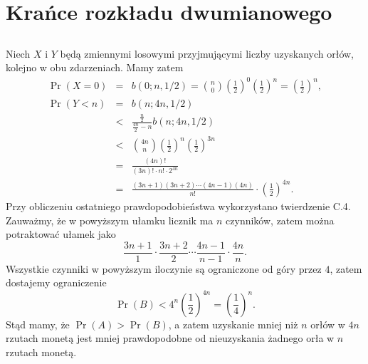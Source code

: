 \subsection{} %

\subsection{} %

\section{Krańce rozkładu dwumianowego}

\subsection{} %
Niech $X$ i $Y$ będą zmiennymi losowymi przyjmującymi liczby uzyskanych orłów, kolejno w obu zdarzeniach. Mamy zatem
\begin{eqnarray*}
	\Pr(X=0) &=& b(0;n,1/2) = \binom{n}{0}\left(\frac{1}{2}\right)^0\left(\frac{1}{2}\right)^n = \left(\frac{1}{2}\right)^n, \\
	\Pr(Y<n) &=& b(n;4n,1/2) \\
	&<& \frac{\frac{n}{2}}{\frac{4n}{2}-n}b(n;4n,1/2) \\
	&<& \binom{4n}{n}\left(\frac{1}{2}\right)^n\left(\frac{1}{2}\right)^{3n} \\
	&=& \frac{(4n)!}{(3n)!\cdot n!\cdot 2^{4n}} \\
	&=& \frac{(3n+1)(3n+2)\cdots(4n-1)(4n)}{n!}\cdot\left(\frac{1}{2}\right)^{4n}.
\end{eqnarray*}
Przy obliczeniu ostatniego prawdopodobieństwa wykorzystano twierdzenie C.4. Zauważmy, że w powyższym ułamku licznik ma $n$ czynników, zatem można potraktować ułamek jako
\[
	\frac{3n+1}{1}\cdot\frac{3n+2}{2}\cdots\frac{4n-1}{n-1}\cdot\frac{4n}{n}.
\]
Wszystkie czynniki w powyższym iloczynie są ograniczone od góry przez $4$, zatem dostajemy ograniczenie
\[
	\Pr(B) < 4^n\left(\frac{1}{2}\right)^{4n} = \left(\frac{1}{4}\right)^n.
\]
Stąd mamy, że $\Pr(A)>\Pr(B)$, a zatem uzyskanie mniej niż $n$ orłów w $4n$ rzutach monetą jest mniej prawdopodobne od nieuzyskania żadnego orła w $n$ rzutach monetą.

